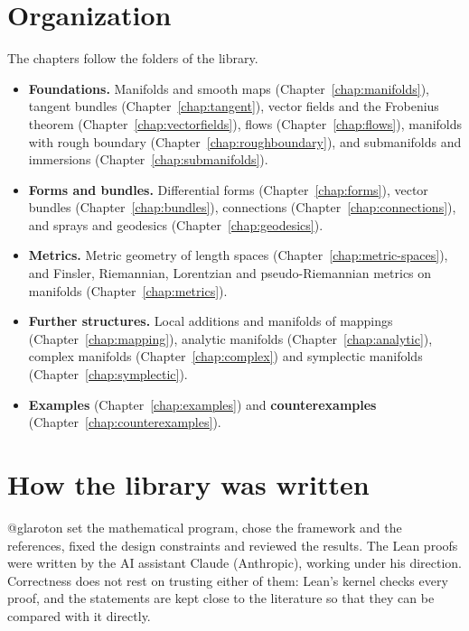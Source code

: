 \section*{Organization}

The chapters follow the folders of the library.

\begin{itemize}
  \item \textbf{Foundations.} Manifolds and smooth maps (Chapter~\ref{chap:manifolds}), tangent
    bundles (Chapter~\ref{chap:tangent}), vector fields and the Frobenius theorem
    (Chapter~\ref{chap:vectorfields}), flows (Chapter~\ref{chap:flows}), manifolds with rough
    boundary (Chapter~\ref{chap:roughboundary}), and submanifolds and immersions
    (Chapter~\ref{chap:submanifolds}).
  \item \textbf{Forms and bundles.} Differential forms (Chapter~\ref{chap:forms}), vector bundles
    (Chapter~\ref{chap:bundles}), connections (Chapter~\ref{chap:connections}), and sprays and
    geodesics (Chapter~\ref{chap:geodesics}).
  \item \textbf{Metrics.} Metric geometry of length spaces (Chapter~\ref{chap:metric-spaces}), and
    Finsler, Riemannian, Lorentzian and pseudo-Riemannian metrics on manifolds
    (Chapter~\ref{chap:metrics}).
  \item \textbf{Further structures.} Local additions and manifolds of mappings
    (Chapter~\ref{chap:mapping}), analytic manifolds (Chapter~\ref{chap:analytic}), complex
    manifolds (Chapter~\ref{chap:complex}) and symplectic manifolds (Chapter~\ref{chap:symplectic}).
  \item \textbf{Examples} (Chapter~\ref{chap:examples}) and \textbf{counterexamples}
    (Chapter~\ref{chap:counterexamples}).
\end{itemize}

\section*{How the library was written}

@glaroton set the mathematical program, chose the framework and the references, fixed
the design constraints and reviewed the results. The Lean proofs were written by the AI assistant
Claude (Anthropic), working under his direction. Correctness does not rest on trusting either of
them: Lean's kernel \cite{dMU21} checks every proof, and the statements are kept close to the
literature so that they can be compared with it directly.
